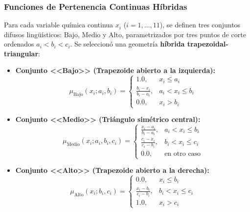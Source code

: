 \documentclass{article}
\begin{document}
\subsubsection{Funciones de Pertenencia Continuas Híbridas}
Para cada variable química continua $x_i$ ($i = 1, \dots, 11$), se definen tres conjuntos difusos lingüísticos: $\text{Bajo}$, $\text{Medio}$ y $\text{Alto}$, parametrizados por tres puntos de corte ordenados $a_i < b_i < c_i$. Se seleccionó una geometría \textbf{híbrida trapezoidal-triangular}:
\begin{itemize}
    \item \textbf{Conjunto <<Bajo>> (Trapezoide abierto a la izquierda):}
    \begin{equation}
        \mu_{\text{Bajo}}(x_i; a_i, b_i) = \begin{cases}
            1.0, & x_i \le a_i \\
            \frac{b_i - x_i}{b_i - a_i}, & a_i < x_i \le b_i \\
            0.0, & x_i > b_i
        \end{cases}
    \end{equation}
    \item \textbf{Conjunto <<Medio>> (Triángulo simétrico central):}
    \begin{equation}
        \mu_{\text{Medio}}(x_i; a_i, b_i, c_i) = \begin{cases}
            \frac{x_i - a_i}{b_i - a_i}, & a_i < x_i \le b_i \\
            \frac{c_i - x_i}{c_i - b_i}, & b_i < x_i \le c_i \\
            0.0, & \text{en otro caso}
        \end{cases}
    \end{equation}
    \item \textbf{Conjunto <<Alto>> (Trapezoide abierto a la derecha):}
    \begin{equation}
        \mu_{\text{Alto}}(x_i; b_i, c_i) = \begin{cases}
            0.0, & x_i \le b_i \\
            \frac{x_i - b_i}{c_i - b_i}, & b_i < x_i \le c_i \\
            1.0, & x_i > c_i
        \end{cases}
    \end{equation}
\end{itemize}
\end{document}
